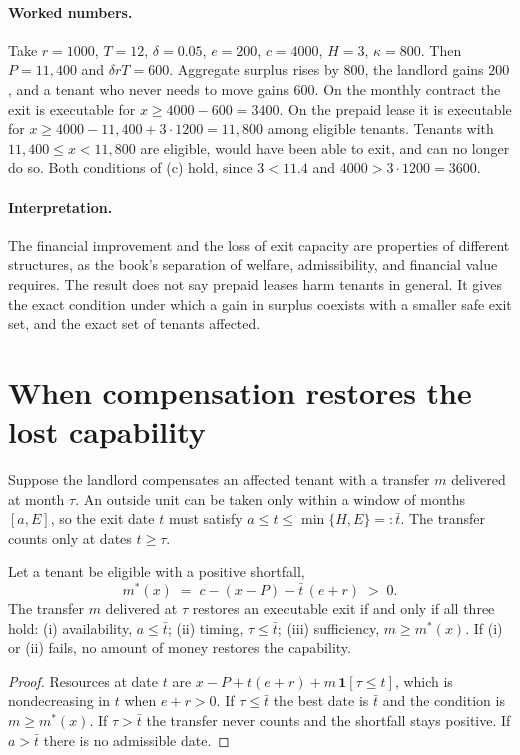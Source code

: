 \paragraph{Worked numbers.} Take $r=1000$, $T=12$, $\delta=0.05$, $e=200$, $c=4000$, $H=3$, $\kappa=800$. Then $P=11{,}400$ and $\delta rT=600$. Aggregate surplus rises by $800$, the landlord gains $200$, and a tenant who never needs to move gains $600$. On the monthly contract the exit is executable for $x\ge 4000-600=3400$. On the prepaid lease it is executable for $x\ge 4000-11{,}400+3\cdot 1200=11{,}800$ among eligible tenants. Tenants with $11{,}400\le x<11{,}800$ are eligible, would have been able to exit, and can no longer do so. Both conditions of (c) hold, since $3<11.4$ and $4000>3\cdot 1200=3600$.

\paragraph{Interpretation.} The financial improvement and the loss of exit capacity are properties of different structures, as the book's separation of welfare, admissibility, and financial value requires. The result does not say prepaid leases harm tenants in general. It gives the exact condition under which a gain in surplus coexists with a smaller safe exit set, and the exact set of tenants affected.

\section*{When compensation restores the lost capability}

Suppose the landlord compensates an affected tenant with a transfer $m$ delivered at month $\tau$. An outside unit can be taken only within a window of months $[a,E]$, so the exit date $t$ must satisfy $a\le t\le\min\{H,E\}=:\bar t$. The transfer counts only at dates $t\ge\tau$.

\begin{hthm}\label{thm:H2}
Let a tenant be eligible with a positive shortfall,
\[
m^\ast(x)\;=\;c-(x-P)-\bar t\,(e+r)\;>\;0 .
\]
The transfer $m$ delivered at $\tau$ restores an executable exit if and only if all three hold: (i) availability, $a\le\bar t$; (ii) timing, $\tau\le\bar t$; (iii) sufficiency, $m\ge m^\ast(x)$. If (i) or (ii) fails, no amount of money restores the capability.
\end{hthm}

\begin{proof}
Resources at date $t$ are $x-P+t(e+r)+m\,\mathbf 1[\tau\le t]$, which is nondecreasing in $t$ when $e+r>0$. If $\tau\le\bar t$ the best date is $\bar t$ and the condition is $m\ge m^\ast(x)$. If $\tau>\bar t$ the transfer never counts and the shortfall stays positive. If $a>\bar t$ there is no admissible date.
\end{proof}

